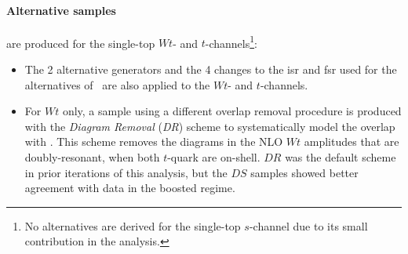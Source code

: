 \paragraph{Alternative samples} are produced for the single-top $Wt$- and $t$-channels\footnote{No alternatives are derived for the single-top $s$-channel due to its small contribution in the analysis.}:
\begin{itemize}
  \item The 2 alternative generators and the 4 changes to the \gls{isr} and \gls{fsr} used for the alternatives of \ttb\ are also applied to the $Wt$- and $t$-channels.
  \item For $Wt$ only, a sample using a different overlap removal procedure is produced with the \textit{Diagram Removal} (\textit{DR}) scheme \cite{StefanoFrixione_2008} to systematically model the overlap with \ttb. This scheme removes the diagrams in the NLO $Wt$ amplitudes that are doubly-resonant, when both $t$-quark are on-shell. $DR$ was the default scheme in prior iterations of this analysis, but the $DS$ samples showed better agreement with data in the boosted regime.
\end{itemize}

